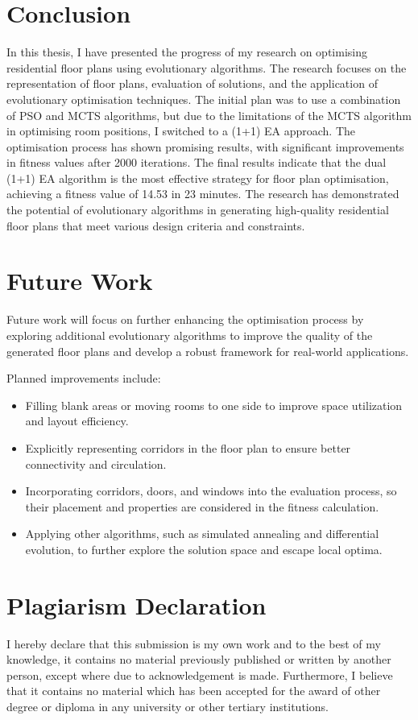 \documentclass[]{article}
\begin{document}
\section{Conclusion}
In this thesis, I have presented the progress of my research on optimising residential floor plans using evolutionary algorithms. The research focuses on the representation of floor plans, evaluation of solutions, and the application of evolutionary optimisation techniques. The initial plan was to use a combination of PSO and MCTS algorithms, but due to the limitations of the MCTS algorithm in optimising room positions, I switched to a (1+1) EA approach. The optimisation process has shown promising results, with significant improvements in fitness values after 2000 iterations.
The final results indicate that the dual (1+1) EA algorithm is the most effective strategy for floor plan optimisation, achieving a fitness value of 14.53 in 23 minutes. The research has demonstrated the potential of evolutionary algorithms in generating high-quality residential floor plans that meet various design criteria and constraints.

\section{Future Work}
Future work will focus on further enhancing the optimisation process by exploring additional evolutionary algorithms to improve the quality of the generated floor plans and develop a robust framework for real-world applications.

Planned improvements include:
\begin{itemize}
    \item Filling blank areas or moving rooms to one side to improve space utilization and layout efficiency.
    \item Explicitly representing corridors in the floor plan to ensure better connectivity and circulation.
    \item Incorporating corridors, doors, and windows into the evaluation process, so their placement and properties are considered in the fitness calculation.
    \item Applying other algorithms, such as simulated annealing and differential evolution, to further explore the solution space and escape local optima.
\end{itemize}


\section{Plagiarism Declaration}
I hereby declare that this submission is my own work and to the best of my knowledge, it contains no material previously published or written by another person, except where due to acknowledgement is made. Furthermore, I believe that it contains no material which has been accepted for the award of other degree or diploma in any university or other tertiary institutions.

\newpage


\end{document}
